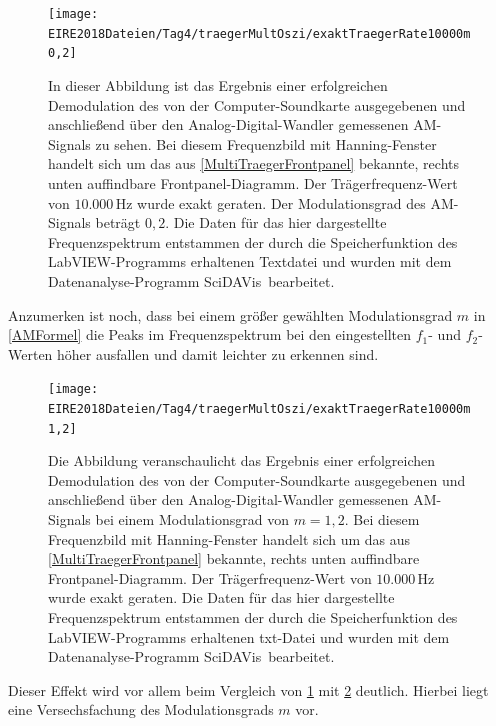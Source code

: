 \documentclass[
a4paper,
12pt,
pagesize,
ngerman
]{scrartcl}
\begin{document}
	\begin{figure}[H]
		\centering
		\texttt{[image: EIRE2018Dateien/Tag4/traegerMultOszi/exaktTraegerRate10000m0,2]}
		\caption{In dieser Abbildung ist das Ergebnis einer erfolgreichen Demodulation des von der Computer-Soundkarte ausgegebenen und anschließend über den Analog-Digital-Wandler gemessenen AM-Signals zu sehen. Bei diesem Frequenzbild mit Hanning-Fenster handelt sich um das aus \cref{MultiTraegerFrontpanel} bekannte, rechts unten auffindbare Frontpanel-Diagramm. Der Trägerfrequenz-Wert von $10.000\,$Hz wurde exakt geraten. Der Modulationsgrad des AM-Signals beträgt $0,2$. Die Daten für das hier dargestellte Frequenzspektrum entstammen der durch die Speicherfunktion des LabVIEW-Programms erhaltenen Textdatei und wurden mit dem Datenanalyse-Programm \glqq SciDAVis\grqq\ bearbeitet.}
		\label{AMDemodsuccm02}
	\end{figure}
	
	Anzumerken ist noch, dass bei einem größer gewählten Modulationsgrad $m$ in \cref{AMFormel} die Peaks im Frequenzspektrum bei den eingestellten $f_1$- und $f_2$-Werten höher ausfallen und damit leichter zu erkennen sind. 
	
	\begin{figure}[H]
		\centering
		\texttt{[image: EIRE2018Dateien/Tag4/traegerMultOszi/exaktTraegerRate10000m1,2]}
		\caption{Die Abbildung veranschaulicht das Ergebnis einer erfolgreichen Demodulation des von der Computer-Soundkarte ausgegebenen und anschließend über den Analog-Digital-Wandler gemessenen AM-Signals bei einem Modulationsgrad von $m = 1,2$. Bei diesem Frequenzbild mit Hanning-Fenster handelt sich um das aus \cref{MultiTraegerFrontpanel} bekannte, rechts unten auffindbare Frontpanel-Diagramm. Der Trägerfrequenz-Wert von $10.000\,$Hz wurde exakt geraten. Die Daten für das hier dargestellte Frequenzspektrum entstammen der durch die Speicherfunktion des LabVIEW-Programms erhaltenen txt-Datei und wurden mit dem Datenanalyse-Programm \glqq SciDAVis\grqq\ bearbeitet.}
		\label{AMDemodsuccm12}
	\end{figure}

	\noindent Dieser Effekt wird vor allem beim Vergleich von \cref{AMDemodsuccm02} mit \cref{AMDemodsuccm12} deutlich. 
	Hierbei liegt eine Versechsfachung des Modulationsgrads $m$ vor.
	
\end{document}
